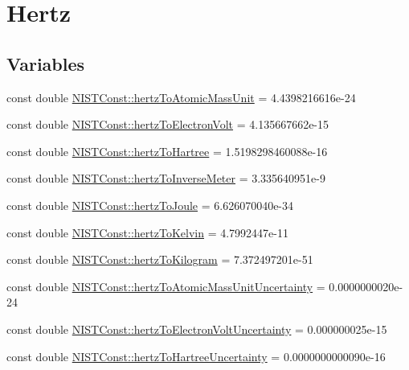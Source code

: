 \hypertarget{group___n_i_s_t_const-_hertz}{}\section{Hertz}
\label{group___n_i_s_t_const-_hertz}
\subsection*{Variables}
\begin{DoxyCompactItemize}
\item 
const double \hyperlink{group___n_i_s_t_const-_hertz_ga5e2fd7ea13ae13a34435ff0578082d34}{N\+I\+S\+T\+Const\+::hertz\+To\+Atomic\+Mass\+Unit} = 4.\+4398216616e-\/24
\item 
const double \hyperlink{group___n_i_s_t_const-_hertz_ga035f43de5d8ad8208675c53a0057d14d}{N\+I\+S\+T\+Const\+::hertz\+To\+Electron\+Volt} = 4.\+135667662e-\/15
\item 
const double \hyperlink{group___n_i_s_t_const-_hertz_ga2ededb8b750b44cde6d83c1c07b6a870}{N\+I\+S\+T\+Const\+::hertz\+To\+Hartree} = 1.\+5198298460088e-\/16
\item 
const double \hyperlink{group___n_i_s_t_const-_hertz_ga6d5ccd7fed8ad7f2abb5c368565a1666}{N\+I\+S\+T\+Const\+::hertz\+To\+Inverse\+Meter} = 3.\+335640951e-\/9
\item 
const double \hyperlink{group___n_i_s_t_const-_hertz_ga827c4e99287fcd5363fabcfe1381cc37}{N\+I\+S\+T\+Const\+::hertz\+To\+Joule} = 6.\+626070040e-\/34
\item 
const double \hyperlink{group___n_i_s_t_const-_hertz_gacda137a5d10ebba59b340d770802678f}{N\+I\+S\+T\+Const\+::hertz\+To\+Kelvin} = 4.\+7992447e-\/11
\item 
const double \hyperlink{group___n_i_s_t_const-_hertz_ga7b63758ab74cb80c236d4eacd5b89484}{N\+I\+S\+T\+Const\+::hertz\+To\+Kilogram} = 7.\+372497201e-\/51
\item 
const double \hyperlink{group___n_i_s_t_const-_hertz_ga7ec0e57b96db2ded3c361465c8770d71}{N\+I\+S\+T\+Const\+::hertz\+To\+Atomic\+Mass\+Unit\+Uncertainty} = 0.\+0000000020e-\/24
\item 
const double \hyperlink{group___n_i_s_t_const-_hertz_ga695a041e052cf0684ddbf956b7b8df80}{N\+I\+S\+T\+Const\+::hertz\+To\+Electron\+Volt\+Uncertainty} = 0.\+000000025e-\/15
\item 
const double \hyperlink{group___n_i_s_t_const-_hertz_gaa2e1f37030bea54753040b6728792d90}{N\+I\+S\+T\+Const\+::hertz\+To\+Hartree\+Uncertainty} = 0.\+0000000000090e-\/16

\end{DoxyCompactItemize}
